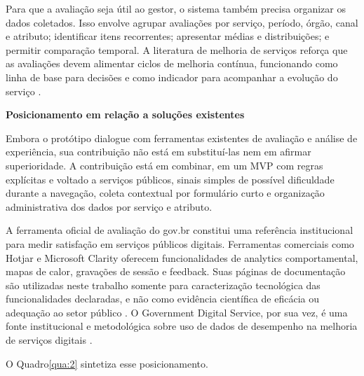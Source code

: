 Para que a avaliação seja útil ao gestor, o sistema também precisa organizar os dados coletados. Isso envolve agrupar avaliações por serviço, período, órgão, canal e atributo; identificar itens recorrentes; apresentar médias e distribuições; e permitir comparação temporal. A literatura de melhoria de serviços reforça que as avaliações devem alimentar ciclos de melhoria contínua, funcionando como linha de base para decisões e como indicador para acompanhar a evolução do serviço \cite{lima2020m4,gds2021dados,brasil2026}.

\textbf{Posicionamento em relação a soluções existentes}

Embora o protótipo dialogue com ferramentas existentes de avaliação e análise de experiência, sua contribuição não está em substituí-las nem em afirmar superioridade. A contribuição está em combinar, em um MVP com regras explícitas e voltado a serviços públicos, sinais simples de possível dificuldade durante a navegação, coleta contextual por formulário curto e organização administrativa dos dados por serviço e atributo.

A ferramenta oficial de avaliação do gov.br constitui uma referência institucional para medir satisfação em serviços públicos digitais. Ferramentas comerciais como Hotjar e Microsoft Clarity oferecem funcionalidades de analytics comportamental, mapas de calor, gravações de sessão e feedback. Suas páginas de documentação são utilizadas neste trabalho somente para caracterização tecnológica das funcionalidades declaradas, e não como evidência científica de eficácia ou adequação ao setor público \cite{brasil2026,hotjar2026,microsoft2026}. O Government Digital Service, por sua vez, é uma fonte institucional e metodológica sobre uso de dados de desempenho na melhoria de serviços digitais \cite{gds2021dados}.

O Quadro\nobreakspace{}\ref{qua:2} sintetiza esse posicionamento.

